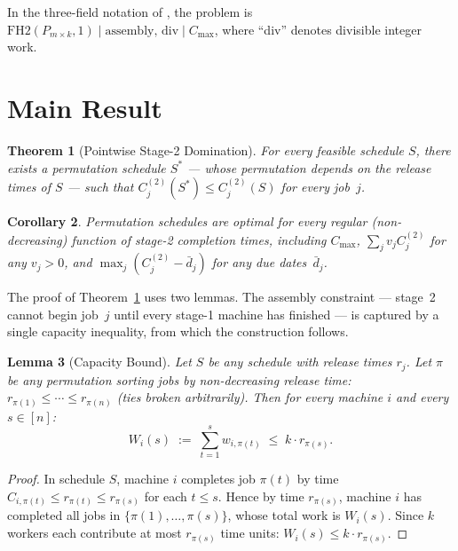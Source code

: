 \documentclass[11pt,titlepage]{article}
\newtheorem{theorem}{Theorem}
\newtheorem{lemma}[theorem]{Lemma}
\newtheorem{corollary}[theorem]{Corollary}
\begin{document}
In the three-field notation of
\textcite{graham1979}, the problem is
$\text{FH2}(P_{m \times k}, 1) \mid
\text{assembly, div} \mid C_{\max}$, where ``div'' denotes
divisible integer work.

\section{Main Result}
\label{sec:main}

\begin{theorem}[Pointwise Stage-2 Domination]
\label{thm:main}
For every feasible schedule $S$, there exists a permutation
schedule $S^*$ --- whose permutation depends on the release
times of $S$ --- such that
$C^{(2)}_j(S^*) \leq C^{(2)}_j(S)$ for every job~$j$.
\end{theorem}

\begin{corollary}
\label{cor:main}
Permutation schedules are optimal for every regular
(non-decreasing) function of stage-2 completion times,
including $C_{\max}$, $\sum_j v_j C^{(2)}_j$ for any
$v_j > 0$, and $\max_j (C^{(2)}_j - \bar{d}_j)$ for any due
dates~$\bar{d}_j$.
\end{corollary}

The proof of Theorem~\ref{thm:main} uses two lemmas. The
assembly constraint --- stage~2 cannot begin job~$j$ until
every stage-1 machine has finished --- is captured by a single
capacity inequality, from which the construction follows.

\begin{lemma}[Capacity Bound]
\label{lem:capacity}
Let $S$ be any schedule with release times $r_j$. Let $\pi$ be
any permutation sorting jobs by non-decreasing release time:
$r_{\pi(1)} \leq \cdots \leq r_{\pi(n)}$ (ties broken
arbitrarily). Then for every machine $i$ and every
$s \in [n]$:
\[
  W_i(s) \;:=\; \sum_{t=1}^{s} w_{i,\pi(t)}
  \;\leq\; k \cdot r_{\pi(s)}.
\]
\end{lemma}

\begin{proof}
In schedule $S$, machine $i$ completes job $\pi(t)$ by time
$C_{i,\pi(t)} \leq r_{\pi(t)} \leq r_{\pi(s)}$ for each
$t \leq s$. Hence by time $r_{\pi(s)}$, machine $i$ has
completed all jobs in $\{\pi(1), \ldots, \pi(s)\}$, whose
total work is $W_i(s)$. Since $k$ workers each contribute at
most $r_{\pi(s)}$ time units: $W_i(s) \leq k \cdot r_{\pi(s)}$.
\end{proof}
\end{document}
